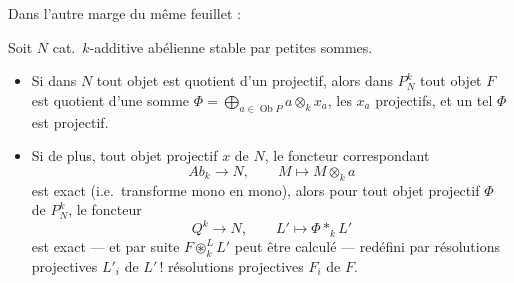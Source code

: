 \documentclass[11pt,a4paper]{article}
\begin{document}

Dans l'autre marge du même feuillet :

Soit $N$ cat.\ $k$-additive abélienne stable par petites sommes.

\begin{itemize}
  \item[a)] Si dans $N$ tout objet est quotient d'un projectif, alors dans
    $P^{k}_{N}$ tout objet $F$ est quotient d'une somme
    $\Phi = \bigoplus_{a \in \operatorname{Ob} P} a \otimes_k x_a$, les $x_a$
    projectifs, et un tel $\Phi$ est projectif.
  \item[b)] Si de plus,  tout objet projectif \struck{\ill{}} $x$ de
    $N$, le foncteur correspondant
    \[
    Ab_k \longrightarrow N, \qquad M \longmapsto M \otimes_k a
    \]
    est exact (i.e.\ transforme mono en mono), alors \struck{\ill{}} pour tout
    objet projectif $\Phi$ de $P^{k}_{N}$, le foncteur
    \[
    Q^{k} \longrightarrow N, \qquad L' \longmapsto \Phi *_k L'
    \]
    est exact --- et par suite $F \circledast^{L}_{k} L'$ peut être calculé ---
    redéfini par résolutions projectives $L'_i$ de $L'$\,! 
    résolutions projectives $F_i$ de $F$.  
\end{itemize}

\end{document}
